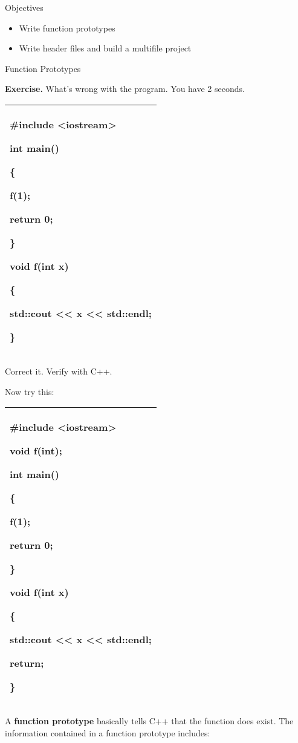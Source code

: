 \documentclass[
]{article}
\author{}
\date{}
\providecommand{\tightlist}{%
  \setlength{\itemsep}{0pt}\setlength{\parskip}{0pt}}
\begin{document}
Objectives

\begin{itemize}
\tightlist
\item
  Write function prototypes
\item
  Write header files and build a multifile project
\end{itemize}

Function Prototypes

\textbf{Exercise.} What's wrong with the program. You have 2 seconds.

\begin{longtable}[]{@{}l@{}}
\toprule
\endhead
\begin{minipage}[t]{0.97\columnwidth}\raggedright
\#include \textless iostream\textgreater{}

int main()

\{

f(1);

return 0;

\}

void f(int x)

\{

std::cout \textless\textless{} x \textless\textless{} std::endl;

\}\strut
\end{minipage}\tabularnewline
\bottomrule
\end{longtable}

Correct it. Verify with C++.

Now try this:

\begin{longtable}[]{@{}l@{}}
\toprule
\endhead
\begin{minipage}[t]{0.97\columnwidth}\raggedright
\#include \textless iostream\textgreater{}

void f(int);

int main()

\{

f(1);

return 0;

\}

void f(int x)

\{

std::cout \textless\textless{} x \textless\textless{} std::endl;

return;

\}\strut
\end{minipage}\tabularnewline
\bottomrule
\end{longtable}

A \textbf{function prototype} basically tells C++ that the function does
exist. The information contained in a function prototype includes:
\end{document}
